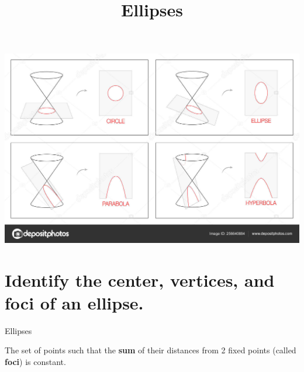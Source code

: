 \documentclass[t,dvipsnames,table]{beamer}
\title{Ellipses}
\author{}
\date{}
\begin{document}
\begin{frame} 
\maketitle
\end{frame}

\begin{frame}[c]
\includegraphics[scale=0.80]{Images/conics.jpg}
\end{frame}

\section{Identify the center, vertices, and foci of an ellipse.}

\begin{frame}{Ellipses}
\begin{tcolorbox}[colback=red!10!white, colframe=red!60!black,, title=\textbf{Ellipses}]
The set of points such that the \textbf{sum} of their distances from 2 fixed points (called \textbf{foci}) is constant.
\end{tcolorbox}
\end{frame}
\end{document}
